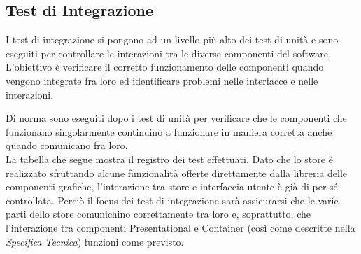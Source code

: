 \subsection{Test di Integrazione}
\par I test di integrazione si pongono ad un livello più alto dei test di unità e sono eseguiti per controllare le interazioni tra le diverse componenti del software. L'obiettivo è verificare il corretto funzionamento delle componenti quando vengono integrate fra loro ed identificare problemi nelle interfacce e nelle interazioni.
\par Di norma sono eseguiti dopo i test di unità per verificare che le componenti che funzionano singolarmente continuino a funzionare in maniera corretta anche quando comunicano fra loro.
\vspace{0.5cm} \\ La tabella che segue mostra il registro dei test effettuati. Dato che lo store è realizzato sfruttando alcune funzionalità offerte direttamente dalla libreria delle componenti grafiche, l'interazione tra store e interfaccia utente è già di per sé controllata. Perciò il focus dei test di integrazione sarà assicurarsi che le varie parti dello store comunichino correttamente tra loro e, soprattutto, che l'interazione tra componenti Presentational e Container (così come descritte nella \textit{Specifica Tecnica}) funzioni come previsto.
\renewcommand{\arraystretch}{1.5}
